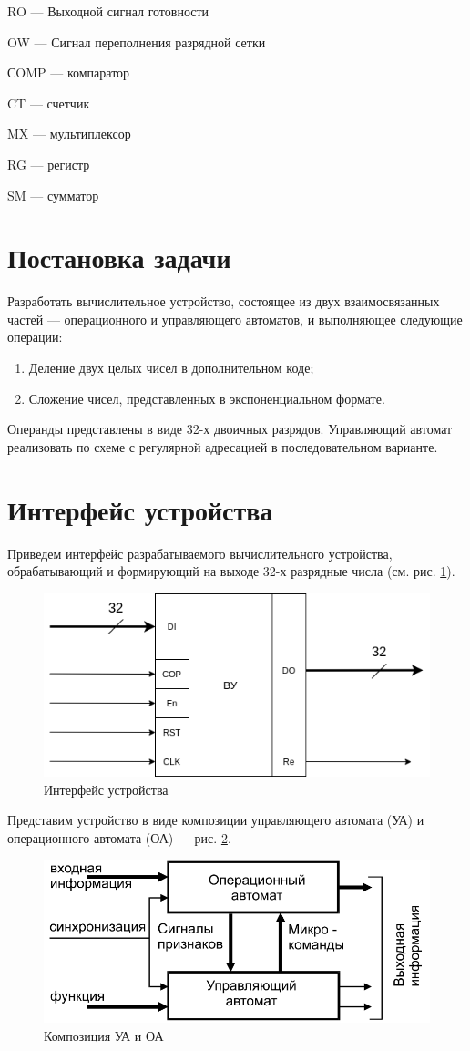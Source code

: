 \documentclass[a4paper,14pt]{extarticle}
\begin{document}
 RO		---	Выходной сигнал готовности
 
 OW		---	Сигнал переполнения разрядной сетки
 
 СOMP		---	компаратор
 
 CT			---	счетчик
 
 MX		---	мультиплексор
 
 RG		---	регистр
 
 
 SM		---	сумматор
\section{Постановка задачи}
Разработать вычислительное устройство, состоящее из  двух взаимосвязанных частей --- операционного и управляющего автоматов, и выполняющее следующие операции:
\begin{enumerate}
	\item Деление двух целых чисел в дополнительном коде;
	\item Сложение чисел, представленных в экспоненциальном формате.
\end{enumerate}
Операнды представлены в виде 32-х двоичных разрядов. Управляющий автомат реализовать по схеме с регулярной адресацией в последовательном варианте.
\section{Интерфейс устройства}
\label{sec:interface}
Приведем интерфейс разрабатываемого вычислительного устройства, обрабатывающий и формирующий на выходе 32-х разрядные числа (см. рис. \ref{fig:courseinterface}).
\begin{figure}[h!]
	\centering
	\includegraphics[width=0.7\linewidth]{images/course_interface}
	\caption{Интерфейс устройства}
	\label{fig:courseinterface}
\end{figure}
Представим устройство в виде композиции управляющего автомата (УА) и операционного автомата (ОА) --- рис. \ref{fig:courseinterfaceoama}.
\begin{figure}[h!]
	\centering
	\includegraphics[width=0.7\linewidth]{images/course_interface_oa_ma}
	\caption{Композиция УА и ОА}
	\label{fig:courseinterfaceoama}
\end{figure}
\end{document}
